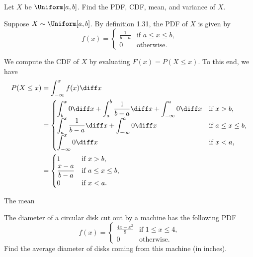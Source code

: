 \begin{problem}[Handout 12, \# 2]
  Let \(X\) be \(\Uniform[a,b]\). Find the PDF, CDF, mean, and variance of
  \(X\).
\end{problem}
\begin{solution}
  Suppose \(X\sim\Uniform[a,b]\). By definition 1.31, the PDF of \(X\) is
  given by
  \[
    f(x)=
    \begin{cases}
      \displaystyle\frac{1}{b-a}&\text{if \(a\leq x\leq b\),}\\
      0&\text{otherwise.}
    \end{cases}
  \]

  We compute the CDF of \(X\) by evaluating \(F(x)=P(X\leq x)\). To this
  end, we have
  \begin{align*}
    P(X\leq x)
    &=\int_{-\infty}^x f(x)\diff x\\
    &=
      \begin{cases}
      \displaystyle
      \int_b^x 0\diff x+\int_a^b\frac{1}{b-a}\diff x+\int_{-\infty}^a 0\diff x
      &\text{if \(x>b\),}\\
      \displaystyle
      \int_a^x\frac{1}{b-a}\diff x+\int_{-\infty}^a 0\diff x
      &\text{if \(a\leq x\leq b\),}\\
      \displaystyle
      \int_{-\infty}^x 0\diff x
      &\text{if \(x<a\),}
    \end{cases}\\
    &=
      \begin{cases}
      1&\text{if \(x>b\),}\\
      \displaystyle
      \frac{x-a}{b-a}&\text{if \(a\leq x\leq b\),}\\
      0&\text{if \(x<a\).}
    \end{cases}
  \end{align*}

  The mean
\end{solution}
\newpage

\begin{problem}[Handout 12, \# 8]
  The diameter of a circular disk cut out by a machine has the following
  PDF
  \[
    f(x)=\begin{cases}
      \displaystyle\frac{4x-x^2}{9}&\text{if \(1\leq x\leq 4\),}\\
      0&\text{otherwise.}
    \end{cases}
  \]
  Find the average diameter of disks coming from this machine (in inches).
\end{problem}
\begin{solution}

\end{solution}
\newpage

